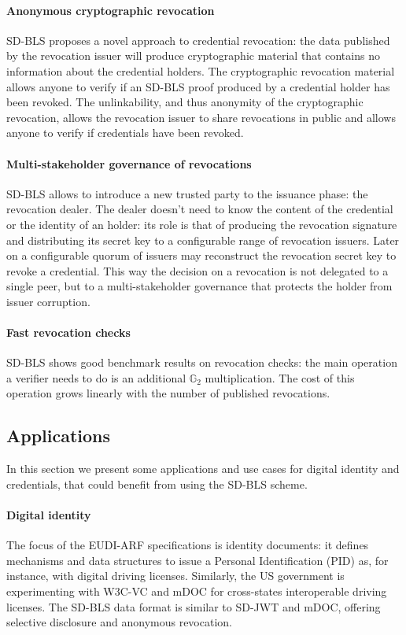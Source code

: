 \paragraph{Anonymous cryptographic revocation}
SD-BLS proposes a novel approach to credential revocation: the data
published by the revocation issuer will produce cryptographic material
that contains no information about the credential holders. The
cryptographic revocation material allows anyone to verify if an SD-BLS
proof produced by a credential holder has been revoked. The
unlinkability, and thus anonymity of the cryptographic revocation,
allows the revocation issuer to share revocations in public and allows
anyone to verify if credentials have been revoked.

\paragraph{Multi-stakeholder governance of revocations}
SD-BLS allows to introduce a new trusted party to the issuance phase:
the revocation dealer. The dealer doesn't need to know the content of
the credential or the identity of an holder: its role is that of
producing the revocation signature and distributing its secret key to
a configurable range of revocation issuers. Later on a configurable
quorum of issuers may reconstruct the revocation secret key to revoke
a credential. This way the decision on a revocation is not delegated
to a single peer, but to a multi-stakeholder governance that protects
the holder from issuer corruption.

\paragraph{Fast revocation checks}
SD-BLS shows good benchmark results on revocation checks: the main
operation a verifier needs to do is an additional $\mathbb{G}_2$
multiplication. The cost of this operation grows linearly with the
number of published revocations.

\subsection{Applications}
In this section we present some applications and use cases for digital
identity and credentials, that could benefit from using the SD-BLS
scheme.

\paragraph{Digital identity}
The focus of the EUDI-ARF specifications is identity documents: it
defines mechanisms and data structures to issue a Personal
Identification (PID) as, for instance, with digital driving
licenses. Similarly, the US government is experimenting with W3C-VC
and mDOC for cross-states interoperable driving licenses. The SD-BLS
data format is similar to SD-JWT and mDOC, offering selective
disclosure and anonymous revocation.

